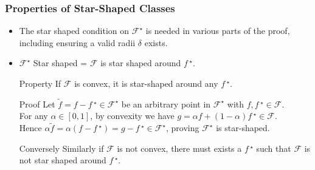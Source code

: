\documentclass[11pt]{beamer}
\newcommand{\cF}{\mathcal{F}}
\newcommand{\fstar}{f\,^\star}
\newcommand{\ftilde}{\widetilde{f}}
\begin{document}
		\begin{frame}
			\frametitle{Properties of Star-Shaped Classes}
			\begin{itemize}
				\item The star shaped condition on $\cF^\star$ is needed in various parts of the proof, including ensuring a valid radii $\delta$ exists.
				
				\item $\cF^\star$ Star shaped = $\cF$ is star shaped around $\fstar$.				
				
				\begin{block}{Property}
					If $\cF$ is convex, it is star-shaped around any $\fstar$. 				
				\end{block}
				
				\begin{block}{Proof}
					Let $\widetilde{f} = f - \fstar \in \cF^\star$ be an arbitrary point in $\cF^\star$ with $f, \fstar \in \cF$.\\
					For any $\alpha \in [0, 1]$, by convexity we have $g = \alpha f + (1-\alpha) \fstar \in \cF$.\\			
					Hence $\alpha \ftilde = \alpha(f - \fstar) = g - \fstar \in \cF^\star$, proving $\cF^\star$ is star-shaped.			
				\end{block}
				\begin{block}{Conversely}
					Similarly if $\cF$ is not convex, there must exists a $\fstar$ such that $\cF$ is not star shaped around $\fstar$.	
				\end{block}
			\end{itemize}						
		\end{frame}
	
			
	
\end{document}
